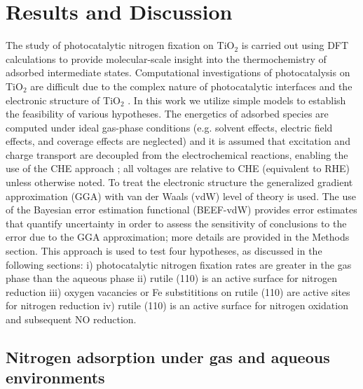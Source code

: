 \documentclass[journal=ascecg,manuscript=article,articletitle=true]{achemso}
\begin{document}
\section{Results and Discussion}

The study of photocatalytic nitrogen fixation on TiO$_2$ is carried out using DFT calculations to provide molecular-scale insight into the thermochemistry of adsorbed intermediate states. Computational investigations of photocatalysis on TiO$_2$ are difficult due to the complex nature of photocatalytic interfaces \cite{Calle_Vallejo_2012,Hellman2017} and the electronic structure of TiO$_2$ \cite{Arroyo_de_Dompablo_2011,Diebold2003}. In this work we utilize simple models to establish the feasibility of various hypotheses. The energetics of adsorbed species are computed under ideal gas-phase conditions (e.g. solvent effects, electric field effects, and coverage effects are neglected) and it is assumed that excitation and charge transport are decoupled from the electrochemical reactions, enabling the use of the CHE approach \cite{Norskov_2004,Peterson_2010,Hellman2017,Calle_Vallejo_2012}; all voltages are relative to CHE (equivalent to RHE) unless otherwise noted. To treat the electronic structure the generalized gradient approximation (GGA) with van der Waals (vdW) level of theory is used. The use of the Bayesian error estimation functional \cite{Wellendorff_2012} (BEEF-vdW) provides error estimates that quantify uncertainty in order to assess the sensitivity of conclusions to the error due to the GGA approximation; more details are provided in the Methods section. This approach is used to test four hypotheses, as discussed in the following sections: i) photocatalytic nitrogen fixation rates are greater in the gas phase than the aqueous phase ii) rutile (110) is an active surface for nitrogen reduction iii) oxygen vacancies or Fe substititions on rutile (110) are active sites for nitrogen reduction iv) rutile (110) is an active surface for nitrogen oxidation and subsequent NO reduction.

\subsection{Nitrogen adsorption under gas and aqueous environments}
\end{document}
